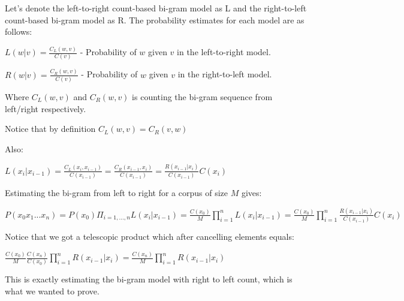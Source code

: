 Let's denote the left-to-right count-based bi-gram model as L and the right-to-left count-based bi-gram model as R. The probability estimates for each model are as follows:

$L(w | v) = \frac{C_{L}(w,v)}{C(v)}$ - Probability of $w$ given $v$ in the left-to-right model.

$R(w | v) = \frac{C_{R}(w,v)}{C(v)}$ - Probability of $w$ given $v$ in the right-to-left model.

Where $C_{L}(w,v)$ and $C_{R}(w,v)$ is counting the bi-gram sequence from left/right respectively.

Notice that by definition $C_{L}(w,v) = C_{R}(v,w)$

Also:

$L(x_i | x_{i-1}) = \frac{C_{L}(x_i,x_{i-1})}{C(x_{i-1})} = \frac{C_{R}(x_{i-1},x_i)}{C(x_{i-1})} = \frac{R(x_{i-1} | x_i)}{C(x_{i-1})}C(x_i)$

Estimating the bi-gram from left to right for a corpus of size $M$ gives:

$P(x_0x_1...x_n)=P(x_0)\Pi_{i=1,...,n}L(x_i | x_{i-1})=\frac{C(x_0)}{M}\prod_{i=1}^{n}L(x_i | x_{i-1})=
\frac{C(x_0)}{M}\prod_{i=1}^{n}\frac{R(x_{i-1} | x_i)}{C(x_{i-1})}C(x_i)$

Notice that we got a telescopic product which after cancelling elements equals:

$\frac{C(x_0)}{M}\frac{C(x_n)}{C(x_0)}\prod_{i=1}^{n}R(x_{i-1} | x_i) = \frac{C(x_n)}{M}\prod_{i=1}^{n}R(x_{i-1} | x_i)$

This is exactly estimating the bi-gram model with right to left count, which is what we wanted to prove.